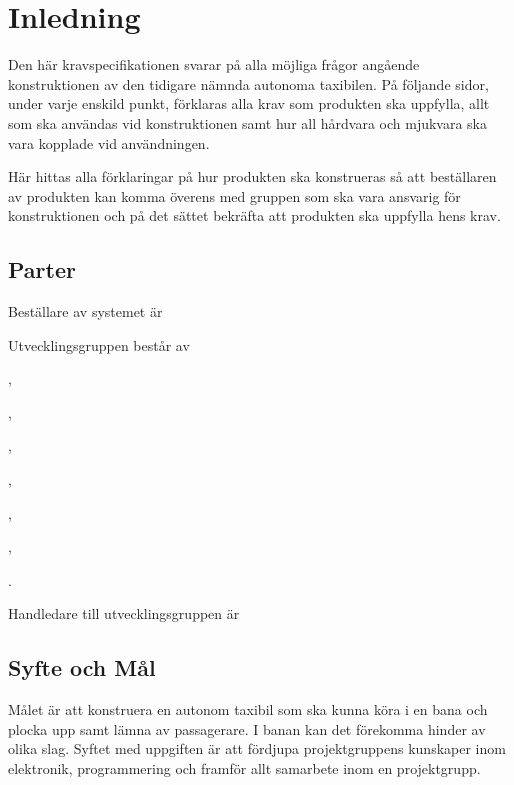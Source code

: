 \documentclass[kravspec/krav.tex]{subfiles}
\begin{document}
\section{Inledning}
Den här kravspecifikationen svarar på alla möjliga frågor angående
konstruktionen av den tidigare nämnda autonoma taxibilen. På följande sidor,
under varje enskild punkt, förklaras alla krav som produkten ska uppfylla,
allt som ska användas vid konstruktionen samt hur all hårdvara och mjukvara
ska vara kopplade vid användningen.

Här hittas alla förklaringar på  hur produkten ska konstrueras så att
beställaren av produkten kan komma överens med gruppen som ska vara
ansvarig för konstruktionen och på det sättet bekräfta att produkten ska
uppfylla hens krav.

\subsection{Parter}
Beställare av systemet är
\begin{list}{}
    \item \bfseries \VARbestallare
\end{list}\vspace{4mm}

\noindent
Utvecklingsgruppen består av
{\bfseries\begin{list}{}
   \item \VARprojektledare,
   \item \VARdokumentansvarig,
   \item \VARgranssnitt,
   \item \VARhardware,
   \item \VARsekreterare,
   \item \VARkundansvarig,
   \item \VARarkitekt.
\end{list}}\vspace{4mm}

\noindent
Handledare till utvecklingsgruppen är
\begin{list}{}	
	\item \bfseries \LIPShandledare
\end{list}\vspace{4mm}

\subsection{Syfte och Mål}
Målet är att konstruera en autonom taxibil som ska kunna köra i en bana och
plocka upp samt lämna av passagerare. I banan kan det förekomma hinder av olika
slag. Syftet med uppgiften är att fördjupa projektgruppens kunskaper inom
elektronik, programmering och framför allt samarbete inom en projektgrupp.
\end{document}
